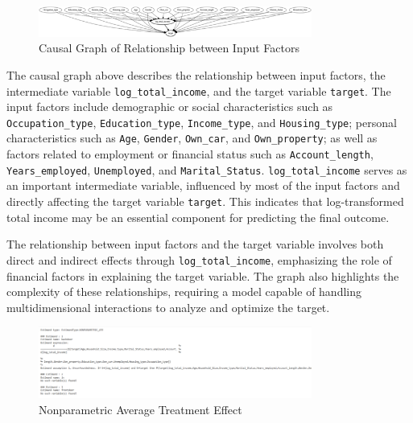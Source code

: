 \documentclass[12pt]{report}
\begin{document}
    \begin{figure}[h!]
        \centering
        \includegraphics[width=0.8\textwidth]{resources/pic/causal graph of relationship between input factors.png}
        \caption{Causal Graph of Relationship between Input Factors}
        \label{fig:causal graph of relationship between input factors}
    \end{figure}

    The causal graph above describes the relationship between input factors, the intermediate variable \texttt{log\_total\_income}, and the target variable \texttt{target}. The input factors include demographic or social characteristics such as \texttt{Occupation\_type}, \texttt{Education\_type}, \texttt{Income\_type}, and \texttt{Housing\_type}; personal characteristics such as \texttt{Age}, \texttt{Gender}, \texttt{Own\_car}, and \texttt{Own\_property}; as well as factors related to employment or financial status such as \texttt{Account\_length}, \texttt{Years\_employed}, \texttt{Unemployed}, and \texttt{Marital\_Status}. \texttt{log\_total\_income} serves as an important intermediate variable, influenced by most of the input factors and directly affecting the target variable \texttt{target}. This indicates that log-transformed total income may be an essential component for predicting the final outcome.

    The relationship between input factors and the target variable involves both direct and indirect effects through \texttt{log\_total\_income}, emphasizing the role of financial factors in explaining the target variable. The graph also highlights the complexity of these relationships, requiring a model capable of handling multidimensional interactions to analyze and optimize the target.

    \begin{figure}[h!]
        \centering
        \includegraphics[width=0.8\textwidth]{resources/pic/Nonparametric Average Treatment Effect.png}
        \caption{Nonparametric Average Treatment Effect}
        \label{fig:Nonparametric Average Treatment Effect}
    \end{figure}
\end{document}
